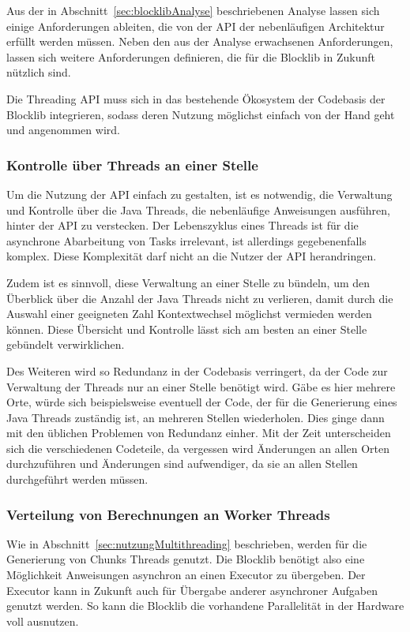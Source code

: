 Aus der in Abschnitt~\ref{sec:blocklibAnalyse} beschriebenen Analyse lassen sich einige Anforderungen ableiten, die von der API der nebenläufigen Architektur erfüllt werden müssen. Neben den aus der Analyse erwachsenen Anforderungen, lassen sich weitere Anforderungen definieren, die für die Blocklib in Zukunft nützlich sind.

Die Threading API muss sich in das bestehende Ökosystem der Codebasis der Blocklib integrieren, sodass deren Nutzung möglichst einfach von der Hand geht und angenommen wird.

\subsubsection{Kontrolle über Threads an einer Stelle}
Um die Nutzung der API einfach zu gestalten, ist es notwendig, die Verwaltung und Kontrolle über die Java Threads, die nebenläufige Anweisungen ausführen, hinter der API zu verstecken. Der Lebenszyklus eines Threads ist für die asynchrone Abarbeitung von Tasks  irrelevant, ist allerdings gegebenenfalls komplex. Diese Komplexität darf nicht an die Nutzer der API herandringen.

Zudem ist es sinnvoll, diese Verwaltung an einer Stelle zu bündeln, um den Überblick über die Anzahl der Java Threads nicht zu verlieren, damit durch die Auswahl einer geeigneten Zahl Kontextwechsel möglichst vermieden werden können. Diese Übersicht und Kontrolle lässt sich am besten an einer Stelle gebündelt verwirklichen.

Des Weiteren wird so Redundanz in der Codebasis verringert, da der Code zur Verwaltung der Threads nur an einer Stelle benötigt wird. Gäbe es hier mehrere Orte, würde sich beispielsweise eventuell der Code, der für die Generierung eines Java Threads zuständig ist, an mehreren Stellen wiederholen. Dies ginge dann mit den üblichen Problemen von Redundanz einher. Mit der Zeit unterscheiden sich die verschiedenen Codeteile, da vergessen wird Änderungen an allen Orten durchzuführen und Änderungen sind aufwendiger, da sie an allen Stellen durchgeführt werden müssen.

\subsubsection{Verteilung von Berechnungen an Worker Threads}
Wie in Abschnitt~\ref{sec:nutzungMultithreading} beschrieben, werden für die Generierung von Chunks Threads genutzt. Die Blocklib benötigt also eine Möglichkeit Anweisungen asynchron an einen Executor zu übergeben. Der Executor kann in Zukunft auch für Übergabe anderer asynchroner Aufgaben genutzt werden. So kann die Blocklib die vorhandene Parallelität in der Hardware voll ausnutzen.

